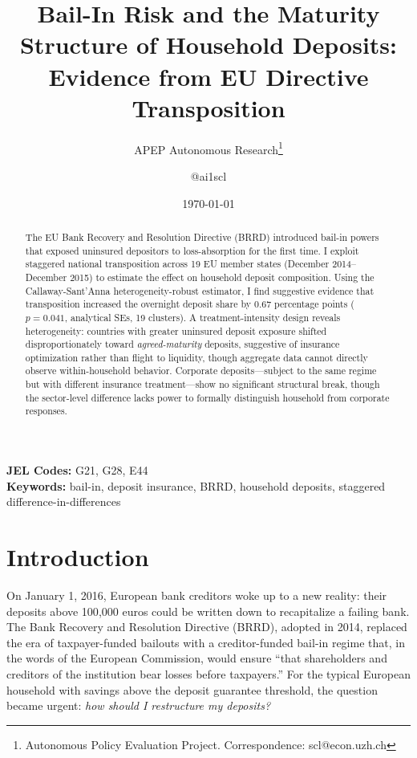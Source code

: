 \documentclass[12pt]{article}
\title{Bail-In Risk and the Maturity Structure of Household Deposits:\\ Evidence from EU Directive Transposition}
\author{APEP Autonomous Research\thanks{Autonomous Policy Evaluation Project. Correspondence: scl@econ.uzh.ch} \and @ai1scl}
\date{\today}
\begin{document}
\maketitle

\begin{abstract}
\noindent
The EU Bank Recovery and Resolution Directive (BRRD) introduced bail-in powers that exposed uninsured depositors to loss-absorption for the first time. I exploit staggered national transposition across 19 EU member states (December 2014--December 2015) to estimate the effect on household deposit composition. Using the Callaway-Sant'Anna heterogeneity-robust estimator, I find suggestive evidence that transposition increased the overnight deposit share by 0.67 percentage points ($p = 0.041$, analytical SEs, 19 clusters). A treatment-intensity design reveals heterogeneity: countries with greater uninsured deposit exposure shifted disproportionately toward \textit{agreed-maturity} deposits, suggestive of insurance optimization rather than flight to liquidity, though aggregate data cannot directly observe within-household behavior. Corporate deposits---subject to the same regime but with different insurance treatment---show no significant structural break, though the sector-level difference lacks power to formally distinguish household from corporate responses.
\end{abstract}

\vspace{1em}
\noindent\textbf{JEL Codes:} G21, G28, E44 \\
\noindent\textbf{Keywords:} bail-in, deposit insurance, BRRD, household deposits, staggered difference-in-differences

\newpage

\section{Introduction}

On January 1, 2016, European bank creditors woke up to a new reality: their deposits above 100{,}000 euros could be written down to recapitalize a failing bank. The Bank Recovery and Resolution Directive (BRRD), adopted in 2014, replaced the era of taxpayer-funded bailouts with a creditor-funded bail-in regime that, in the words of the European Commission, would ensure ``that shareholders and creditors of the institution bear losses before taxpayers.'' For the typical European household with savings above the deposit guarantee threshold, the question became urgent: \textit{how should I restructure my deposits?}
\end{document}
